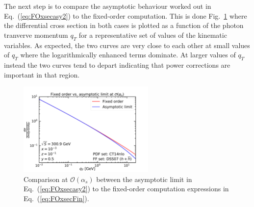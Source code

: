 \documentclass[10pt,a4paper]{article}
\begin{document}
The next step is to compare the asymptotic behaviour worked out in
Eq.~(\ref{eq:FOxsecasy2}) to the fixed-order computation. This is done
Fig.~\ref{fig:FOvsAsy} where the differential cross section in both
cases is plotted as a function of the photon tranverve momentum $q_T$
for a representative set of values of the kinematic variables. As
expected, the two curves are very close to each other at small values
of $q_T$ where the logarithmically enhanced terms dominate. At larger
values of $q_T$ instead the two curves tend to depart indicating that
power corrections are important in that region.
\begin{figure}[t]
  \begin{centering}
    \includegraphics[width=0.6\textwidth]{../plots/FOvsAsy}
    \caption{Comparison at $\mathcal{O}(\alpha_s)$ between the
      asymptotic limit in Eq.~(\ref{eq:FOxsecasy2}) to the fixed-order
      computation expressions in
      Eq.~(\ref{eq:FOxsecFin}).\label{fig:FOvsAsy}}
  \end{centering}
\end{figure}
\end{document}
